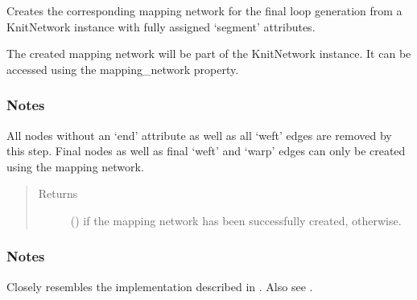 \documentclass[letterpaper,10pt,english]{sphinxmanual}
\begin{document}
\begin{fulllineitems}
\begin{fulllineitems}
\label{\detokenize{cockatoo:cockatoo.KnitNetwork.create_mapping_network}}
Creates the corresponding mapping network for the final loop generation
from a KnitNetwork instance with fully assigned ‘segment’ attributes.

The created mapping network will be part of the KnitNetwork instance.
It can be accessed using the mapping\_network property.
\subsubsection*{Notes}

All nodes without an ‘end’ attribute as well as all ‘weft’ edges are
removed by this step. Final nodes as well as final ‘weft’ and ‘warp’
edges can only be created using the mapping network.
\begin{quote}\begin{description}
\item[{Returns}] \leavevmode
{} () \textendash{}  if the mapping network has been successfully created,
 otherwise.

\end{description}\end{quote}
\subsubsection*{Notes}

Closely resembles the implementation described in  \sphinxfootnotemark[1]. Also see
 \sphinxfootnotemark[2].

\end{fulllineitems}



\end{fulllineitems}
\end{document}
